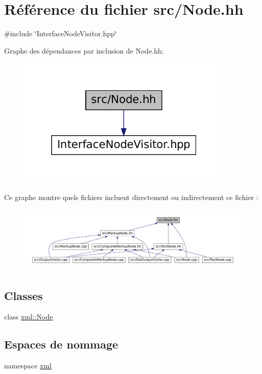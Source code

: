 \hypertarget{_node_8hh}{
\section{Référence du fichier src/Node.hh}
\label{_node_8hh}
}
{\ttfamily \#include \char`\"{}InterfaceNodeVisitor.hpp\char`\"{}}\par
Graphe des dépendances par inclusion de Node.hh:\nopagebreak
\begin{figure}[H]
\begin{center}
\leavevmode
\includegraphics[width=292pt]{_node_8hh__incl}
\end{center}
\end{figure}
Ce graphe montre quels fichiers incluent directement ou indirectement ce fichier :\nopagebreak
\begin{figure}[H]
\begin{center}
\leavevmode
\includegraphics[width=400pt]{_node_8hh__dep__incl}
\end{center}
\end{figure}
\subsection*{Classes}
\begin{DoxyCompactItemize}
\item 
class \hyperlink{classxml_1_1_node}{xml::Node}
\end{DoxyCompactItemize}
\subsection*{Espaces de nommage}
\begin{DoxyCompactItemize}
\item 
namespace \hyperlink{namespacexml}{xml}
\end{DoxyCompactItemize}
